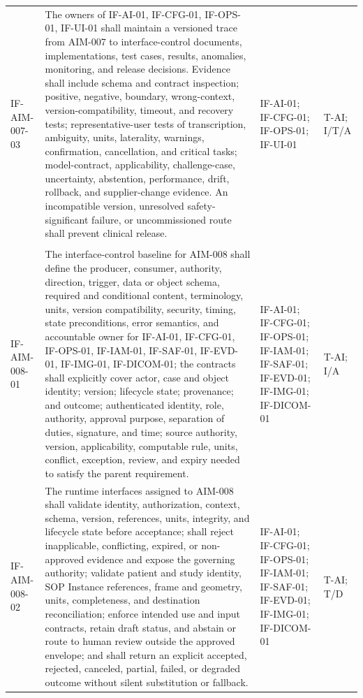 \documentclass[11pt,letterpaper]{article}
\begin{document}
\begin{scriptsize}
\begin{longtable}{@{}L{0.14\textwidth}L{0.49\textwidth}L{0.19\textwidth}L{0.10\textwidth}@{}}
\addlinespace[2pt]
\mbox{IF-AIM-007-03} & The owners of IF-AI-01, IF-CFG-01, IF-OPS-01, IF-UI-01 shall maintain a versioned trace from AIM-007 to interface-control documents, implementations, test cases, results, anomalies, monitoring, and release decisions. Evidence shall include schema and contract inspection; positive, negative, boundary, wrong-context, version-compatibility, timeout, and recovery tests; representative-user tests of transcription, ambiguity, units, laterality, warnings, confirmation, cancellation, and critical tasks; model-contract, applicability, challenge-case, uncertainty, abstention, performance, drift, rollback, and supplier-change evidence. An incompatible version, unresolved safety-significant failure, or uncommissioned route shall prevent clinical release. & IF-AI-01; IF-CFG-01; IF-OPS-01; IF-UI-01 & T-AI; I\slash\allowbreak{}T\slash\allowbreak{}A \\
\addlinespace[2pt]
 \\
\addlinespace[2pt]
\mbox{IF-AIM-008-01} & The interface-control baseline for AIM-008 shall define the producer, consumer, authority, direction, trigger, data or object schema, required and conditional content, terminology, units, version compatibility, security, timing, state preconditions, error semantics, and accountable owner for IF-AI-01, IF-CFG-01, IF-OPS-01, IF-IAM-01, IF-SAF-01, IF-EVD-01, IF-IMG-01, IF-DICOM-01; the contracts shall explicitly cover actor, case and object identity; version; lifecycle state; provenance; and outcome; authenticated identity, role, authority, approval purpose, separation of duties, signature, and time; source authority, version, applicability, computable rule, units, conflict, exception, review, and expiry needed to satisfy the parent requirement. & IF-AI-01; IF-CFG-01; IF-OPS-01; IF-IAM-01; IF-SAF-01; IF-EVD-01; IF-IMG-01; IF-DICOM-01 & T-AI; I\slash\allowbreak{}A \\
\addlinespace[2pt]
\mbox{IF-AIM-008-02} & The runtime interfaces assigned to AIM-008 shall validate identity, authorization, context, schema, version, references, units, integrity, and lifecycle state before acceptance; shall reject inapplicable, conflicting, expired, or non-approved evidence and expose the governing authority; validate patient and study identity, SOP Instance references, frame and geometry, units, completeness, and destination reconciliation; enforce intended use and input contracts, retain draft status, and abstain or route to human review outside the approved envelope; and shall return an explicit accepted, rejected, canceled, partial, failed, or degraded outcome without silent substitution or fallback. & IF-AI-01; IF-CFG-01; IF-OPS-01; IF-IAM-01; IF-SAF-01; IF-EVD-01; IF-IMG-01; IF-DICOM-01 & T-AI; T\slash\allowbreak{}D \\

\end{longtable}
\end{scriptsize}
\end{document}
